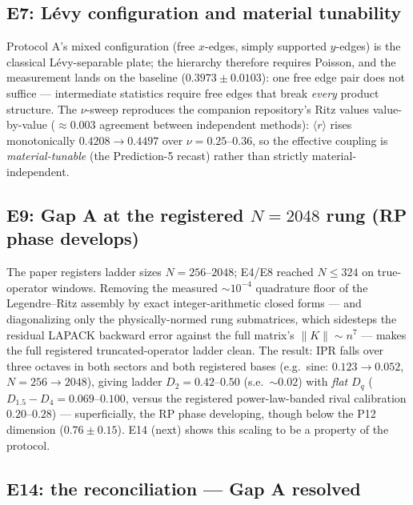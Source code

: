 \documentclass[11pt]{article}
\newcommand{\rmean}{\langle r \rangle}
\begin{document}
\subsection{E7: L\'evy configuration and material tunability}

Protocol A's mixed configuration (free $x$-edges, simply supported
$y$-edges) is the classical L\'evy-separable plate; the hierarchy therefore
requires Poisson, and the measurement lands on the baseline
($0.3973\pm0.0103$): one free edge pair does not suffice --- intermediate
statistics require free edges that break \emph{every} product structure.
The $\nu$-sweep reproduces the companion repository's Ritz values
value-by-value ($\approx0.003$ agreement between independent methods):
$\rmean$ rises monotonically $0.4208\to0.4497$ over $\nu=0.25$--$0.36$, so
the effective coupling is \emph{material-tunable} (the Prediction-5 recast)
rather than strictly material-independent.

\subsection{E9: Gap A at the registered $N=2048$ rung (RP phase develops)}

The paper registers ladder sizes $N=256$--$2048$; E4/E8 reached
$N\le324$ on true-operator windows. Removing the measured $\sim10^{-4}$
quadrature floor of the Legendre--Ritz assembly by exact integer-arithmetic
closed forms --- and diagonalizing only the physically-normed rung
submatrices, which sidesteps the residual LAPACK backward error against the
full matrix's $\|K\|\sim n^7$ --- makes the full registered
truncated-operator ladder clean. The result: IPR falls over three octaves in
both sectors and both registered bases (e.g.\ sine: $0.123\to0.052$,
$N=256\to2048$), giving ladder $D_2=0.42$--$0.50$ (s.e.\ $\sim0.02$) with
\emph{flat} $D_q$ ($D_{1.5}-D_4=0.069$--$0.100$, versus the registered
power-law-banded rival calibration $0.20$--$0.28$) --- superficially, the
RP phase developing, though below the P12 dimension ($0.76\pm0.15$).
E14 (next) shows this scaling to be a property of the protocol.

\subsection{E14: the reconciliation --- Gap A resolved}
\end{document}
